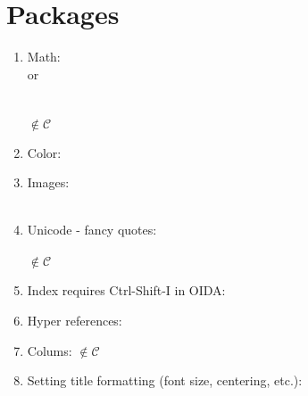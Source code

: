 \documentclass[11pt,a4paper]{article}
\newcommand{\package}[1]{\code{\usepackage{#1}}\label{#1}}
\newcommand{\noncurs}{\hspace{.5cm}$\notin \mathscr{C}$}
\begin{document}
\section{Packages}
\begin{enumerate}
\item Math:\\
  \package{amsmath} or \package{mathtools} \\
  \package{amssymb}\\
  \package{amsfonts}\\
  \package{mathrsfs} \noncurs

\item Color:\\
  \package{color}

\item Images:\\
  \package{graphicx}\\
  \package{epstopdf}

\item Unicode - fancy quotes:\\
  \code{\usepackage[T1]{fontenc}}\\
  \code{\usepackage[utf8]{inputenc}} \noncurs

\item Index requires Ctrl-Shift-I in OIDA: \
  \package{makeidx}

\item Hyper references:\\
  \package{hyperref}

\item Colums: \noncurs\\
  \package{multicol}


\item Setting title formatting (font size, centering, etc.):\\
  \package{sectsty}

  
\end{enumerate}
\end{document}
